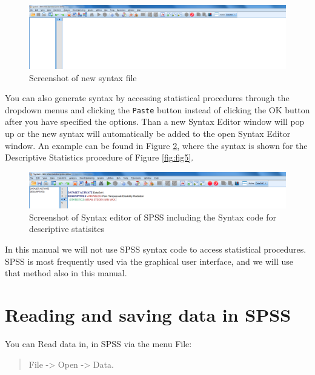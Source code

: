 \documentclass[]{book}
\theoremstyle{definition}
\theoremstyle{definition}
\theoremstyle{definition}
\theoremstyle{remark}
\begin{document}
\begin{figure}

{\centering \includegraphics[width=0.9\linewidth]{images/fig1.6} 

}

\caption{Screenshot of new syntax file}\label{fig:fig6}
\end{figure}

You can also generate syntax by accessing statistical procedures through
the dropdown menus and clicking the \texttt{Paste} button instead of
clicking the OK button after you have specified the options. Than a new
Syntax Editor window will pop up or the new syntax will automatically be
added to the open Syntax Editor window. An example can be found in
Figure \ref{fig:fig7}, where the syntax is shown for the Descriptive
Statistics procedure of Figure \ref{fig:fig5}.

\begin{figure}

{\centering \includegraphics[width=0.9\linewidth]{images/fig1.7} 

}

\caption{Screenshot of Syntax editor of SPSS including the Syntax code for descriptive statisitcs}\label{fig:fig7}
\end{figure}

In this manual we will not use SPSS syntax code to access statistical
procedures. SPSS is most frequently used via the graphical user
interface, and we will use that method also in this manual.

\section{Reading and saving data in
SPSS}\label{reading-and-saving-data-in-spss}

You can Read data in, in SPSS via the menu File:

\begin{quote}
File -\textgreater{} Open -\textgreater{} Data.
\end{quote}
\end{document}
